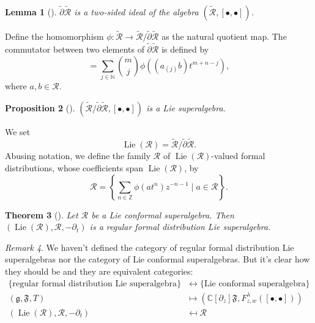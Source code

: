 \documentclass[a4paper, 12pt, reqno]{amsart}
\newtheorem{theorem}{Theorem}[subsection]
\newtheorem{lemma}[theorem]{Lemma}
\newtheorem{proposition}[theorem]{Proposition}
\theoremstyle{remark}
\newtheorem{remark}[theorem]{Remark}
\numberwithin{equation}{subsection}
\DeclareMathOperator{\Lie}{Lie}
\begin{document}
\begin{lemma}[{\cite[Proposition 2.6.1]{nozaradan_introduction_2008}}]
  \label{lmm:1}
  $\widetilde{\partial}\widetilde{\mathcal{R}}$ is a two-sided ideal of the algebra $(\widetilde{\mathcal{R}}, [\bullet, \bullet])$.
\end{lemma}

Define the homomorphism $\phi: \widetilde{\mathcal{R}} \to \widetilde{\mathcal{R}}/\widetilde{\partial}\widetilde{\mathcal{R}}$ as the natural quotient map.
The commutator between two elements of $\widetilde{\partial}\widetilde{\mathcal{R}}$ is defined by
\begin{equation}
  [\phi(at^m), \phi(bt^n)] = \sum_{j \in \mathbb{N}}\binom{m}{j}\phi((a_{(j)}b)t^{m + n - j}),
\end{equation}
where $a, b \in \mathcal{R}$.

\begin{proposition}[{\cite[Proposition 2.6.3]{nozaradan_introduction_2008}}]
  \label{prp:4}
  $(\widetilde{\mathcal{R}}/\widetilde{\partial}\widetilde{\mathcal{R}}, [\bullet, \bullet])$ is a Lie superalgebra.
\end{proposition}

We set
\begin{equation*}
  \Lie(\mathcal{R}) = \widetilde{\mathcal{R}}/\widetilde{\partial}\widetilde{\mathcal{R}}.
\end{equation*}
Abusing notation, we define the family $\mathcal{R}$ of $\Lie(\mathcal{R})$-valued formal distributions, whose coefficients span $\Lie(\mathcal{R})$, by
\begin{equation*}
  \mathcal{R} = \left\{\sum_{n \in \mathbb{Z}}\phi(at^n)z^{-n - 1} \mid a \in \mathcal{R}\right\}.
\end{equation*}

\begin{theorem}[{\cite[Proposition 2.6.4]{nozaradan_introduction_2008}}]
  \label{thr:5}
  Let $\mathcal{R}$ be a Lie conformal superalgebra.
  Then $(\Lie(\mathcal{R}), \mathcal{R},-\partial_t)$ is a regular formal distribution Lie superalgebra. 
\end{theorem}

\begin{remark}
  \label{rmk:5}
  We haven't defined the category of regular formal distribution Lie superalgebras nor the category of Lie conformal superalgebras.
  But it's clear how they should be and they are equivalent categories:
  \begin{align*}
    \{\text{regular formal distribution Lie superalgebra}\} &\leftrightarrow \{\text{Lie conformal superalgebra}\} \\
    (\mathfrak{g}, \mathfrak{F}, T) &\mapsto (\mathbb{C}[\partial_z]\mathfrak{F}, F^{\lambda}_{z, w}([\bullet, \bullet])) \\
    (\Lie(\mathcal{R}), \mathcal{R},-\partial_t) &\mapsfrom \mathcal{R}
  \end{align*}
\end{remark}
\end{document}
